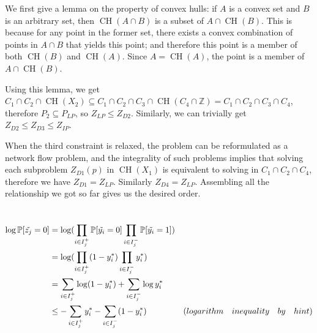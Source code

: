 \documentclass{article}
\begin{document}
We first give a lemma on the property of convex hulls: if $A$ is a convex set and $B$ is an arbitrary set, then $\operatorname{CH}(A\cap B)$ is a subset of $A\cap\operatorname{CH}(B)$. This is because for any point in the former set, there exists a convex combination of points in $A\cap B$ that yields this point; and therefore this point is a member of both $\operatorname{CH}(B)$ and $\operatorname{CH}(A)$. Since $A=\operatorname{CH}(A)$, the point is a member of $A\cap\operatorname{CH}(B)$.


Using this lemma, we get $C_1\cap C_2\cap \operatorname{CH}(X_2)\subseteq C_1\cap C_2\cap C_3\cap \operatorname{CH}(C_4\cap\mathbb Z)=C_1\cap C_2\cap C_3\cap C_4$, therefore $P_2\subseteq P_{LP}$, so $Z_{LP}\le Z_{D2}$. Similarly, we can trivially get $Z_{D2}\le Z_{D3}\le Z_{IP}$.

When the third constraint is relaxed, the problem can be reformulated as a network flow problem, and the integrality of such problems implies that solving each subproblem $Z_{D1}(p)$ in $\operatorname{CH}(X_1)$ is equivalent to solving in $C_1\cap C_2\cap C_4$, therefore we have $Z_{D1}=Z_{LP}$. Similarly $Z_{D4}=Z_{LP}$. Assembling all the relationship we got so far gives us the desired order.

\section{}
\subsection{}
\begin{align*}
    \log \mathbb{P}[\Tilde{z_j} = 0] & = \log(\prod_{i \in I^{+}_{j}} \mathbb{P}[\Tilde{y_i} = 0]\prod_{i \in I^{-}_{j}} \mathbb{P}[\Tilde{y_i} = 1]) &\\
    & =  \log(\prod_{i \in I^{+}_{j}} (1-y^{*}_i)\prod_{i \in I^{-}_{j}} y^{*}_i) &\\
    & = \sum_{i \in I^{+}_{j}} \log(1-y^{*}_i) + \sum_{i \in I^{-}_{j}} \log y^{*}_i &\\
    & \leq - \sum_{i \in I^{+}_{j}}y^{*}_i - \sum_{i \in I^{-}_{j}}(1-y^{*}_i) &(logarithm \quad inequality \quad by \quad hint)\\
\end{align*}

\subsection{}
\end{document}
